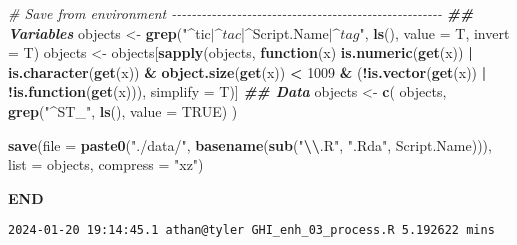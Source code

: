 \documentclass[
  10pt,
  a4paper,oneside]{article}
\newenvironment{Shaded}{\begin{snugshade}}{\end{snugshade}}
\newcommand{\AttributeTok}[1]{\textcolor[rgb]{0.13,0.29,0.53}{#1}}
\newcommand{\CommentTok}[1]{\textcolor[rgb]{0.56,0.35,0.01}{\textit{#1}}}
\newcommand{\ConstantTok}[1]{\textcolor[rgb]{0.56,0.35,0.01}{#1}}
\newcommand{\ControlFlowTok}[1]{\textcolor[rgb]{0.13,0.29,0.53}{\textbf{#1}}}
\newcommand{\DecValTok}[1]{\textcolor[rgb]{0.00,0.00,0.81}{#1}}
\newcommand{\DocumentationTok}[1]{\textcolor[rgb]{0.56,0.35,0.01}{\textbf{\textit{#1}}}}
\newcommand{\FunctionTok}[1]{\textcolor[rgb]{0.13,0.29,0.53}{\textbf{#1}}}
\newcommand{\NormalTok}[1]{#1}
\newcommand{\OtherTok}[1]{\textcolor[rgb]{0.56,0.35,0.01}{#1}}
\newcommand{\SpecialCharTok}[1]{\textcolor[rgb]{0.81,0.36,0.00}{\textbf{#1}}}
\newcommand{\StringTok}[1]{\textcolor[rgb]{0.31,0.60,0.02}{#1}}
\begin{document}
\begin{Shaded}
\begin{Highlighting}[]
\CommentTok{\#  Save from environment  {-}{-}{-}{-}{-}{-}{-}{-}{-}{-}{-}{-}{-}{-}{-}{-}{-}{-}{-}{-}{-}{-}{-}{-}{-}{-}{-}{-}{-}{-}{-}{-}{-}{-}{-}{-}{-}{-}{-}{-}{-}{-}{-}{-}{-}{-}{-}{-}{-}{-}{-}{-}{-}{-}}
\DocumentationTok{\#\# Variables}
\NormalTok{objects }\OtherTok{\textless{}{-}} \FunctionTok{grep}\NormalTok{(}\StringTok{"\^{}tic$|\^{}tac$|\^{}Script.Name$|\^{}tag$"}\NormalTok{, }\FunctionTok{ls}\NormalTok{(), }\AttributeTok{value =}\NormalTok{ T, }\AttributeTok{invert =}\NormalTok{ T)}
\NormalTok{objects }\OtherTok{\textless{}{-}}\NormalTok{ objects[}\FunctionTok{sapply}\NormalTok{(objects, }\ControlFlowTok{function}\NormalTok{(x)}
    \FunctionTok{is.numeric}\NormalTok{(}\FunctionTok{get}\NormalTok{(x)) }\SpecialCharTok{|}
        \FunctionTok{is.character}\NormalTok{(}\FunctionTok{get}\NormalTok{(x)) }\SpecialCharTok{\&}
        \FunctionTok{object.size}\NormalTok{(}\FunctionTok{get}\NormalTok{(x)) }\SpecialCharTok{\textless{}} \DecValTok{1009} \SpecialCharTok{\&}
\NormalTok{        (}\SpecialCharTok{!}\FunctionTok{is.vector}\NormalTok{(}\FunctionTok{get}\NormalTok{(x)) }\SpecialCharTok{|}
             \SpecialCharTok{!}\FunctionTok{is.function}\NormalTok{(}\FunctionTok{get}\NormalTok{(x))), }\AttributeTok{simplify =}\NormalTok{ T)]}
\DocumentationTok{\#\# Data}
\NormalTok{objects }\OtherTok{\textless{}{-}} \FunctionTok{c}\NormalTok{(}
\NormalTok{    objects,}
    \FunctionTok{grep}\NormalTok{(}\StringTok{"\^{}ST\_"}\NormalTok{, }\FunctionTok{ls}\NormalTok{(), }\AttributeTok{value =} \ConstantTok{TRUE}\NormalTok{)}
\NormalTok{)}


\FunctionTok{save}\NormalTok{(}\AttributeTok{file =} \FunctionTok{paste0}\NormalTok{(}\StringTok{"./data/"}\NormalTok{, }\FunctionTok{basename}\NormalTok{(}\FunctionTok{sub}\NormalTok{(}\StringTok{"}\SpecialCharTok{\textbackslash{}\textbackslash{}}\StringTok{.R"}\NormalTok{, }\StringTok{".Rda"}\NormalTok{, Script.Name))),}
     \AttributeTok{list =}\NormalTok{ objects,}
     \AttributeTok{compress =} \StringTok{"xz"}\NormalTok{)}
\end{Highlighting}
\end{Shaded}

\textbf{END}

\begin{verbatim}
2024-01-20 19:14:45.1 athan@tyler GHI_enh_03_process.R 5.192622 mins
\end{verbatim}
\end{document}
